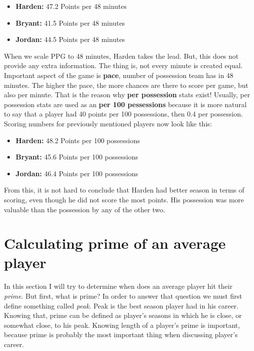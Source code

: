 \documentclass[a4paper]{article}
\begin{document}
\begin{itemize}
	\item \textbf{Harden:} 47.2 Points per 48 minutes
	\item \textbf{Bryant:} 41.5 Points per 48 minutes
	\item \textbf{Jordan:} 44.5 Points per 48 minutes
\end{itemize}

When we scale PPG to 48 minutes, Harden takes the lead. But, this does not provide any extra information. The thing is, not every minute is created equal. Important aspect of the game is \textbf{pace}, number of possession team has in 48 minutes. The higher the pace, the more chances are there to score per game, but also per minute. That is the reason why \textbf{per possession} stats exist! Usually, per possession stats are used as an \textbf{per 100 pessessions} because it is more natural to say that a player had 40 points per 100 possessions, then 0.4 per possession. Scoring numbers for previously mentioned players now look like this:

\begin{itemize}
	\item \textbf{Harden:} 48.2 Points per 100 possessions
	\item \textbf{Bryant:} 45.6 Points per 100 possessions
	\item \textbf{Jordan:} 46.4 Points per 100 possessions
\end{itemize}

From this, it is not hard to conclude that Harden had better season in terms of scoring, even though he did not score the most points. His possession was more valuable than the possession by any of the other two.

\section{Calculating prime of an average player}
\label{sec:prime}

In this section I will try to determine when does an average player hit their \textit{prime}. But first, what is prime? In order to answer that question we must first define something called \textit{peak}. Peak is the best season player had in his career. Knowing that, prime can be defined as player's seasons in which he is close, or somewhat close, to his peak. Knowing length of a player's prime is important, because prime is probably the most important thing when discussing player's career.
\end{document}
